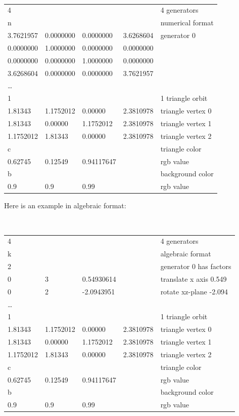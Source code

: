 \documentclass[12pt]{article}
\begin{document}
\begin{center}
{\footnotesize
{\tt
\begin{tabular}{lllll}
4 & & & & 4 generators \\
n & & & & numerical format \\
3.7621957 & 0.0000000 & 0.0000000 & 3.6268604 & generator 0 \\
0.0000000 & 1.0000000 & 0.0000000 & 0.0000000 & \\
0.0000000 & 0.0000000 & 1.0000000 & 0.0000000 & \\
3.6268604 & 0.0000000 & 0.0000000 & 3.7621957 & \\
\dots & & & & \\
1 & & & & 1 triangle orbit \\
1.81343 & 1.1752012 & 0.00000 & 2.3810978 & triangle vertex 0 \\
1.81343 & 0.00000 & 1.1752012 & 2.3810978 & triangle vertex 1 \\
1.1752012 & 1.81343 & 0.00000 & 2.3810978 & triangle vertex 2 \\
c & & & & triangle color \\
0.62745 & 0.12549 & 0.94117647 & & rgb value\\
b & & & & background color \\
0.9 & 0.9 & 0.99 & & rgb value \\
\end{tabular}
}
}
\end{center}

Here is an example in algebraic format:

\begin{center}
{\footnotesize
{\tt
\begin{tabular}{lllll}
4 & & & & 4 generators \\
k & & & & algebraic format \\
2 & & & & generator 0 has factors \\
0 & 3 & 0.54930614 & & translate x axis 0.549 \\
0 & 2 & -2.0943951 & & rotate xz-plane -2.094 \\
\dots & & & & \\
1 & & & & 1 triangle orbit \\
1.81343 & 1.1752012 & 0.00000 & 2.3810978 & triangle vertex 0 \\
1.81343 & 0.00000 & 1.1752012 & 2.3810978 & triangle vertex 1 \\
1.1752012 & 1.81343 & 0.00000 & 2.3810978 & triangle vertex 2 \\
c & & & & triangle color \\
0.62745 & 0.12549 & 0.94117647 & & rgb value\\
b & & & & background color \\
0.9 & 0.9 & 0.99 & & rgb value \\
\end{tabular}
}
}
\end{center}
\end{document}
